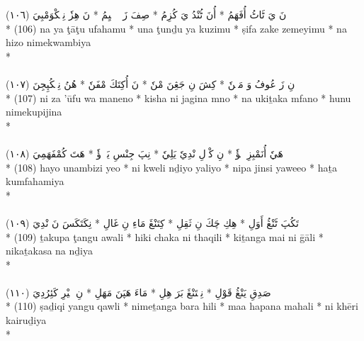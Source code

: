 \documentclass[a4paper, 12pt]{report}
\begin{document}
\begin{center}
\textarabic{(١٠٦) \textcolor{mygreen}{نَ يَ ٹَاٹُ أُفَهَمُ  * أُنَ ٹُنْدُ يَ كُزِمُ  * صِفَ زَكٖ زٖمٖيِمُ  * نَ هِزٗ نِمٖكْوَمْبِيَ }} \\* 
(106) na ya ţāţu ufahamu  * una ţunḏu ya kuzimu  * ṣifa zake zemeyimu  * na hizo nimekwambiya  \\* 
 \\ 
\\[8mm] 

\textarabic{(١٠٧) \textcolor{mygreen}{نِ زَ عُوفُ وَ مَنٖنٗ  * كِشَ نِ جَڠِنَ مْنٗ  * نَ أُكِتَكَ مْفَنٗ  * هُنُ نِمٖكُپِجِنَ }} \\* 
(107) ni za 'ūfu wa maneno  * kisha ni jagina mno  * na ukiṯaka mfano  * hunu nimekupijina  \\* 
 \\ 
\\[8mm] 

\textarabic{(١٠٨) \textcolor{mygreen}{هَيٗ أُنَمْبِزِ يٖؤٗ  * نِ كْوٖلِ نْدِيٗ يَلِيٗ  * نِپَ جِنْسِ يَوٖءٖؤٗ  * هَتَ كُمْفَهَمِيَ }} \\* 
(108) hayo unambizi yeo  * ni kweli nḏiyo yaliyo  * nipa jinsi yaweeo  * haṯa kumfahamiya  \\* 
 \\ 
\\[8mm] 

\textarabic{(١٠٩) \textcolor{mygreen}{تَكُپَ ٹَنْڠُ أَوَلِ  * هِكِ چَكَ نِ ثَقِلِ  * كِتَنْڠَ مَاءِ نِ غَالِ  * نِكَتَكَسَ نَ نْدِيَ }} \\* 
(109) ṯakupa ţangu awali  * hiki chaka ni thaqili  * kiṯanga mai ni ḡāli  * nikaṯakasa na nḏiya  \\* 
 \\ 
\\[8mm] 

\textarabic{(١١٠) \textcolor{mygreen}{صَدِقِ يَنْڠُ قَوْلِ  * نِمٖتَنْڠَ بَرَ هِلِ  * مَاءَ هَپَنَ مَهَلِ  * نِ خٖيْرِ كَئِرُدِيَ }} \\* 
(110) ṣaḏiqi yangu qawli  * nimeṯanga bara hili  * maa hapana mahali  * ni khēri kairuḏiya  \\* 
 \\ 
\\[8mm] 


\end{center}
\end{document}
